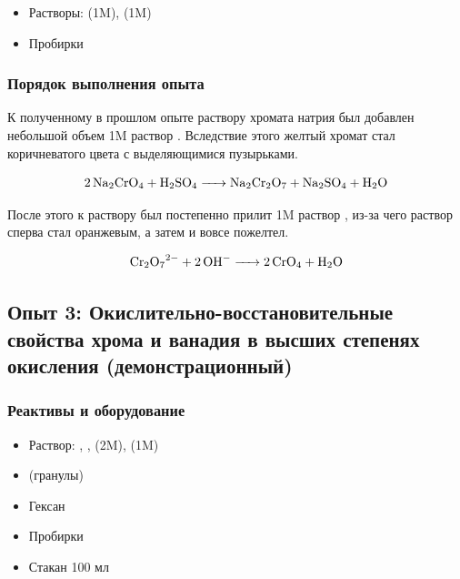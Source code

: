 \documentclass[a4paper, 12pt]{article}
\begin{document}
\begin{itemize}
	\item Растворы:  (1M),  (1M)
	
	\item Пробирки
\end{itemize}

\subsubsection{Порядок выполнения опыта}

К полученному в прошлом опыте раствору хромата натрия был добавлен небольшой объем 1M раствор . Вследствие этого желтый хромат стал коричневатого цвета с выделяющимися пузырьками.

\begin{equation}
	\ce{2Na2CrO4 + H2SO4 -> Na2Cr2O7 + Na2SO4 + H2O}
\end{equation}

После этого к раствору был постепенно прилит 1M раствор , из-за чего раствор сперва стал оранжевым, а затем и вовсе пожелтел.

\begin{equation}
	\ce{Cr2O7^2- + 2OH^- -> 2CrO4 + H2O}
\end{equation}


\subsection{Опыт 3: Окислительно-восстановительные свойства хрома и ванадия в высших степенях окисления (демонстрационный)}

\subsubsection{Реактивы и оборудование}

\begin{itemize}
	\item Раствор: , ,  (2M),  (1M)
	\item {} (гранулы)
	\item Гексан
	
	\item Пробирки
	\item Стакан 100 мл
\end{itemize}
\end{document}
